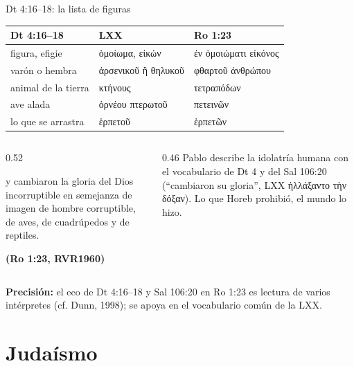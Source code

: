 \documentclass[hyperref={bookmarks=false},aspectratio=169]{beamer}
\newcommand{\grc}[1]{\foreignlanguage{ancientgreek}{#1}}
\newcommand{\fuente}[1]{\par\hfill{\upshape\bfseries\footnotesize\textcolor{azul}{#1}}}
\newcommand{\precision}[1]{{\footnotesize\color{gris}\textbf{Precisión:} #1}}
\begin{document}
\begin{frame}{Dt 4:16--18: la lista de figuras}
\scriptsize\renewcommand{\arraystretch}{1.18}
\begin{tabular}{@{}>{\RaggedRight\arraybackslash}p{3.1cm}>{\RaggedRight\arraybackslash}p{4.3cm}>{\RaggedRight\arraybackslash}p{4.4cm}@{}}
\toprule
\textbf{Dt 4:16--18} & \textbf{LXX} & \textbf{Ro 1:23} \\ \midrule
figura, efigie & \grc{ὁμοίωμα}, \grc{εἰκών} & \grc{ἐν ὁμοιώματι εἰκόνος} \\
varón o hembra & \grc{ἀρσενικοῦ ἢ θηλυκοῦ} & \grc{φθαρτοῦ ἀνθρώπου} \\
animal de la tierra & \grc{κτήνους} & \grc{τετραπόδων} \\
ave alada & \grc{ὀρνέου πτερωτοῦ} & \grc{πετεινῶν} \\
lo que se arrastra & \grc{ἑρπετοῦ} & \grc{ἑρπετῶν} \\
\bottomrule
\end{tabular}\par\medskip
\begin{columns}[t,onlytextwidth]
\begin{column}{0.52\textwidth}
\begin{cita}y cambiaron la gloria del Dios incorruptible en semejanza de imagen de hombre corruptible, de aves, de cuadrúpedos y de reptiles.\fuente{(Ro 1:23, RVR1960)}\end{cita}
\end{column}
\begin{column}{0.46\textwidth}\small
Pablo describe la idolatría humana con el vocabulario de Dt 4 y del Sal 106:20 (``cambiaron su gloria'', LXX \grc{ἠλλάξαντο τὴν δόξαν}). Lo que Horeb prohibió, el mundo lo hizo.
\end{column}
\end{columns}
\precision{el eco de Dt 4:16--18 y Sal 106:20 en Ro 1:23 es lectura de varios intérpretes (cf. Dunn, 1998); se apoya en el vocabulario común de la LXX.}
\end{frame}

\section{Judaísmo}
\end{document}
